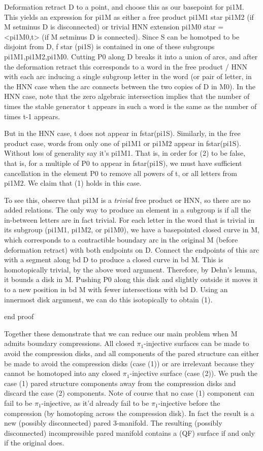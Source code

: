 Deformation retract D to a point, and choose this as our basepoint for pi1M.
This yields an expression for pi1M as either a free product pi1M1 star pi1M2
(if M setminus D is disconnected) or trivial HNN extension pi1M0 star
= <pi1M0,t> (if M setminus D is connected). Since S can be homotped to be
disjoint from D, f star (pi1S) is contained in one of these subgroups
pi1M1,pi1M2,pi1M0.  Cutting P0 along D breaks it into a union of arcs, and
after the deformation retract this corresponds to a word in the free product
/ HNN with each arc inducing a single subgroup letter in the word (or pair of
letter, in the HNN case when the arc connects between the two copies of D in
M0).  In the HNN case, note that the zero algebraic intersection implies that
the number of times the stable generator t appears in such a word is the same
as the number of times t-1 appears.

But in the HNN case, t does not appear in fstar(pi1S).  Similarly, in the free
product case, words from only one of pi1M1 or pi1M2 appear in fstar(pi1S).
Without loss of generality say it's pi1M1. That is, in order for (2) to be
false, that is, for a multiple of P0 to appear in fstar(pi1S), we must have
sufficient cancellation in the element P0 to remove all powers of t, or all
letters from pi1M2. We claim that (1) holds in this case.

To see this, observe that pi1M is a \emph{trivial} free product or HNN, so
there are no added relations. The only way to produce an element in a subgroup
is if all the in-between letters are in fact trivial. For each letter in the
word that is trivial in its subgroup (pi1M1, pi1M2, or pi1M0), we have
a basepointed closed curve in M, which corresponds to a contractible boundary
arc in the original M (before deformation retract) with both endpoints on D.
Connect the endpoints of this arc with a segment along bd D to produce a closed
curve in bd M. This is homotopically trivial, by the above word argument.
Therefore, by Dehn's lemma, it bounds a disk in M. Pushing P0 along this disk
and slightly outside it moves it to a new position in bd M with fewer
intersections with bd D. Using an innermost disk argument, we can do this
isotopically to obtain (1).

end proof

Together these demonstrate that we can reduce our main problem when M admits
boundary compressions. All closed $\pi_1$-injective surfaces can be made to avoid
the compression disks, and all components of the pared structure can either be
made to avoid the compression disks (case (1)) or are irrelevant because they
cannot be homotoped into any closed $\pi_1$-injective surface (case (2)). We push
the case (1) pared structure components away from the compression disks and
discard the case (2) components. Note of course that no case (1) component can
fail to be $\pi_1$-injective, as it'd already fail to be $\pi_1$-injective before the
compression (by homotoping across the compression disk). In fact the result is
a new (possibly disconnected) pared 3-manifold. The resulting (possibly
disconnected) incompressible pared manifold contains a (QF) surface if and only
if the original does.

